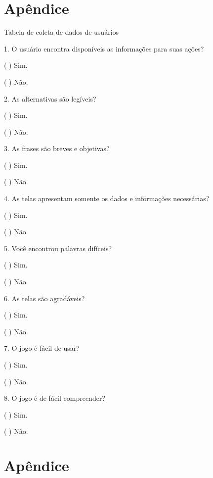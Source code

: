\documentclass[
	12pt,				%
    oneside,			%
	a4paper,			%
	english,			%
	french,				%
	spanish,			%
	brazil,				%
	]{abntex2}
\begin{document}
%
%


\begin{apendicesenv}

\partapendices

\chapter{Apêndice}
Tabela de coleta de dados de usuários

1. O usuário encontra disponíveis as informações para suas ações?

( ) Sim.

( ) Não.

2. As alternativas são legíveis?

( ) Sim.

( ) Não.

3. As frases são breves e objetivas?

( ) Sim.

( ) Não.

4. As telas apresentam somente os dados e informações necessárias?

( ) Sim.

( ) Não.

5. Você encontrou palavras difíceis?

( ) Sim.

( ) Não.

6. As telas são agradáveis?

( ) Sim.

( ) Não.

7. O jogo é fácil de usar?

( ) Sim.

( ) Não.

8. O jogo é de fácil compreender?

( ) Sim.

( ) Não.


\chapter{Apêndice}


\end{apendicesenv}
\end{document}
